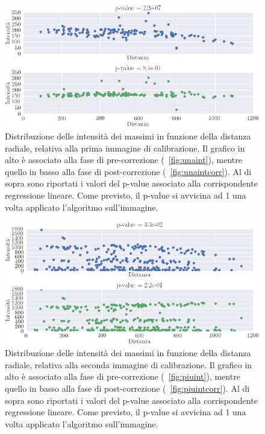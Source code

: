\begin{figure}
 \centering
 \includegraphics[scale=.55]{img/CAP4pvalue1.png}
 \caption{\small{Distribuzione delle intensità dei massimi in funzione della distanza radiale, relativa alla prima immagine di calibrazione. Il grafico in alto è associato alla fase di pre-correzione (\figurename~\ref{fig:unaint}), mentre quello in basso alla fase di post-correzione (\figurename~\ref{fig:unaintcorr}). Al di sopra sono riportati i valori del p-value associato alla corrispondente regressione lineare. Come previsto, il p-value si avvicina ad 1 una volta applicato l'algoritmo sull'immagine.}}
 \label{fig:pvalue1}
\end{figure}

\begin{figure}
 \centering
 \includegraphics[scale=.55]{img/CAP4pvalue2.png}
 \caption{\small{Distribuzione delle intensità dei massimi in funzione della distanza radiale, relativa alla seconda immagine di calibrazione. Il grafico in alto è associato alla fase di pre-correzione (\figurename~\ref{fig:piuint}), mentre quello in basso alla fase di post-correzione (\figurename~\ref{fig:piuintcorr}). Al di sopra sono riportati i valori del p-value associato alla corrispondente regressione lineare. Come previsto, il p-value si avvicina ad 1 una volta applicato l'algoritmo sull'immagine.}}
 \label{fig:pvalue2}
\end{figure}

